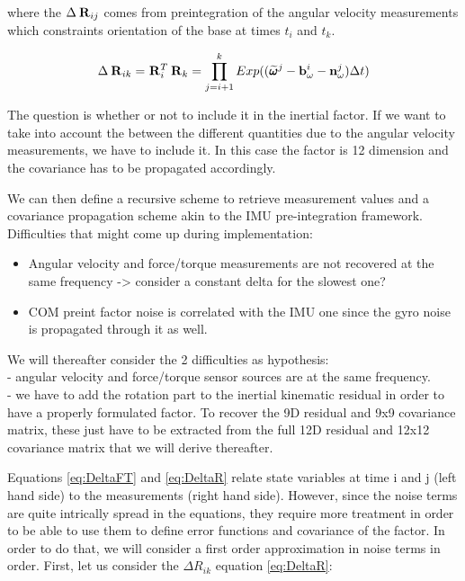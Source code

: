 \documentclass[11pt]{article}
\newcommand{\Rot}[2]{\prescript{#1}{}{\bfR}_{#2}}
\newcommand{\noise}{\bfn}
\newcommand{\bias}{\bfb}
\newcommand{\angvelm}[2]{\prescript{#1}{}{\widetilde{\pmb{\omega}}}_{#2}}
\begin{document}
where the $\Delta \Rot{}{ij}$ comes from preintegration of the angular velocity measurements which constraints orientation of the base at times $t_i$ and $t_k$.

\begin{equation}
    \Delta \Rot{}{ik} = \Rot{}{i}^T \Rot{}{k}
    = \prod_{j=i+1}^{k} Exp((\angvelm{}{}^j - \bias_{\omega}^i - \noise_{\omega}^j)\Delta t)
    \label{eq:DeltaR}
\end{equation}

The question is whether or not to include it in the inertial factor. If we want to take into account the between the different quantities due to the angular velocity measurements, we have to include it. In this case the factor is 12 dimension and the covariance has to be propagated accordingly.


We can then define a recursive scheme to retrieve measurement values and a covariance propagation scheme akin to the IMU pre-integration framework. 
Difficulties that might come up during implementation:

\begin{itemize}
    \item Angular velocity and force/torque measurements are not recovered at the same frequency -> consider a constant delta for the slowest one?
    \item COM preint factor noise is correlated with the IMU one since the gyro noise is propagated through it as well.
\end{itemize}

We will thereafter consider the 2 difficulties as hypothesis: 
\\
- angular velocity and force/torque sensor sources are at the same frequency. 
\\
- we have to add the rotation part to the inertial kinematic residual in order to have a properly formulated factor. To recover the 9D residual and 9x9 covariance matrix, these just have to be extracted from the full 12D residual and 12x12 covariance matrix that we will derive thereafter.


Equations \ref{eq:DeltaFT} and \ref{eq:DeltaR} relate state variables at time i and j (left hand side) to the measurements (right hand side). However, since the noise terms are quite intrically spread in the equations, they require more treatment in order to be able to use them to define error functions and covariance of the factor. In order to do that, we will consider a first order approximation in noise terms in order. First, let us consider the $\Delta R_{ik}$ equation \ref{eq:DeltaR}:
\end{document}
